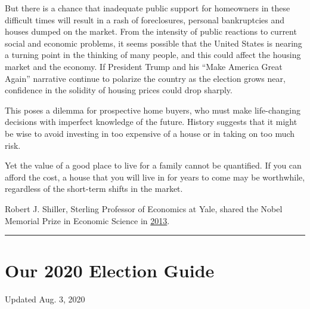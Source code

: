 But there is a chance that inadequate public support for homeowners in
these difficult times will result in a rash of foreclosures, personal
bankruptcies and houses dumped on the market. From the intensity of
public reactions to current social and economic problems, it seems
possible that the United States is nearing a turning point in the
thinking of many people, and this could affect the housing market and
the economy. If President Trump and his ``Make America Great Again''
narrative continue to polarize the country as the election grows near,
confidence in the solidity of housing prices could drop sharply.

This poses a dilemma for prospective home buyers, who must make
life-changing decisions with imperfect knowledge of the future. History
suggests that it might be wise to avoid investing in too expensive of a
house or in taking on too much risk.

Yet the value of a good place to live for a family cannot be quantified.
If you can afford the cost, a house that you will live in for years to
come may be worthwhile, regardless of the short-term shifts in the
market.

Robert J. Shiller, Sterling Professor of Economics at Yale, shared the
Nobel Memorial Prize in Economic Science in
\href{https://www.nytimes3xbfgragh.onion/2013/10/15/business/3-american-professors-awarded-nobel-in-economic-sciences.html?_r=0}{2013}.

\begin{center}\rule{0.5\linewidth}{\linethickness}\end{center}

\hypertarget{our-2020-election-guide}{%
\section{Our 2020 Election Guide}\label{our-2020-election-guide}}

Updated Aug. 3, 2020

